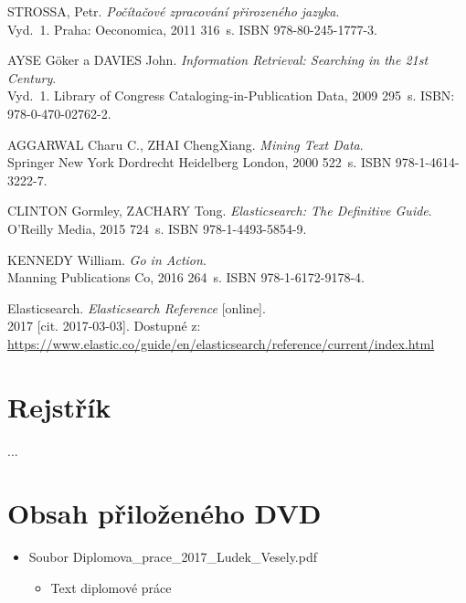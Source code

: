 \documentclass[FM,DP]{tulthesis}
\begin{document}
\begin{thebibliography}{Mm99}

 STROSSA, Petr. \emph{Počítačové zpracování přirozeného jazyka}. \\
Vyd.~1. Praha: Oeconomica, 2011 316~s. ISBN 978-80-245-1777-3.

 AYSE Göker a DAVIES John. \emph{Information Retrieval: Searching in the 21st Century}. \\
Vyd.~1. Library of Congress Cataloging-in-Publication Data, 2009 295~s. ISBN: 978-0-470-02762-2.

 AGGARWAL Charu C., ZHAI ChengXiang. \emph{Mining Text Data}. \\
Springer New York Dordrecht Heidelberg London, 2000 522~s. ISBN 978-1-4614-3222-7.

 CLINTON Gormley, ZACHARY Tong. \emph{Elasticsearch: The Definitive Guide}. \\
O'Reilly Media, 2015 724~s. ISBN 978-1-4493-5854-9.

 KENNEDY William. \emph{Go in Action}. \\
Manning Publications Co, 2016 264~s. ISBN 978-1-6172-9178-4.

 Elasticsearch. \emph{Elasticsearch Reference} [online]. \\
2017 [cit. 2017-03-03]. Dostupné z:\\
\url{https://www.elastic.co/guide/en/elasticsearch/reference/current/index.html}

\end{thebibliography}


\chapter*{Rejstřík}
...


\appendix

\chapter{Obsah přiloženého DVD}

\begin{itemize}
\item Soubor Diplomova\_prace\_2017\_Ludek\_Vesely.pdf
\begin{itemize}
	\item Text diplomové práce
\end{itemize}

\end{itemize}




\end{document}
